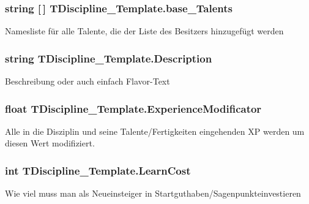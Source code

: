 \subsubsection[{base\+\_\+\+Talents}]{\setlength{\rightskip}{0pt plus 5cm}string \mbox{[}$\,$\mbox{]} T\+Discipline\+\_\+\+Template.\+base\+\_\+\+Talents}\label{struct_t_discipline___template_afb9d738ec47776f7c3dfc98e2507991b}
Namesliste für alle Talente, die der Liste des Besitzers hinzugefügt werden \hypertarget{struct_t_discipline___template_a4dc7bdb0cda5842e90e98457020d54cf}{}
\subsubsection[{Description}]{\setlength{\rightskip}{0pt plus 5cm}string T\+Discipline\+\_\+\+Template.\+Description}\label{struct_t_discipline___template_a4dc7bdb0cda5842e90e98457020d54cf}
Beschreibung oder auch einfach Flavor-\/\+Text \hypertarget{struct_t_discipline___template_a3b3489a37b73856250147d782db4b436}{}
\subsubsection[{Experience\+Modificator}]{\setlength{\rightskip}{0pt plus 5cm}float T\+Discipline\+\_\+\+Template.\+Experience\+Modificator}\label{struct_t_discipline___template_a3b3489a37b73856250147d782db4b436}
Alle in die Disziplin und seine Talente/\+Fertigkeiten eingehenden X\+P werden um diesen Wert modifiziert. \hypertarget{struct_t_discipline___template_a6bfe46a4f49b4de80840a81eccdb0393}{}
\subsubsection[{Learn\+Cost}]{\setlength{\rightskip}{0pt plus 5cm}int T\+Discipline\+\_\+\+Template.\+Learn\+Cost}\label{struct_t_discipline___template_a6bfe46a4f49b4de80840a81eccdb0393}
Wie viel muss man als Neueinsteiger in Startguthaben/\+Sagenpunkteinvestieren \hypertarget{struct_t_discipline___template_aae835040a77ff49d836137add218d1ce}{}

